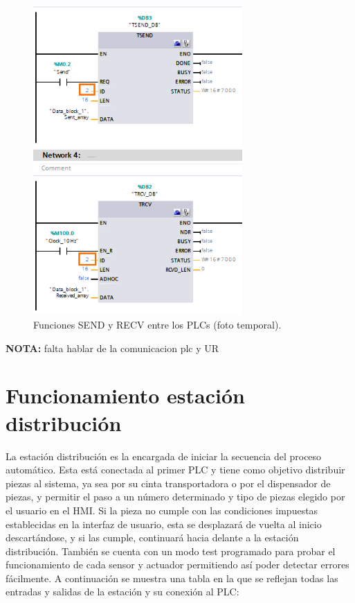\clearpage

\begin{figure} [h!]
  \begin{center}
    \includegraphics[width=8cm]{figs/comunicacion_plcs}
  \end{center}
  \caption{\centering Funciones SEND y RECV entre los PLCs (foto temporal).}
  \label{fig:comunicacion_plcs}
\end{figure} 

\textbf{NOTA:} falta hablar de la comunicacion plc y UR

\section{Funcionamiento estación distribución}
\label{sec:funcionamiento_distribucion}

La estación distribución es la encargada de iniciar la secuencia del proceso automático. Esta está conectada al primer PLC y tiene como objetivo distribuir piezas al sistema, ya sea por su cinta transportadora o por el dispensador de piezas, y permitir el paso a un número determinado y tipo de piezas elegido por el usuario en el HMI. Si la pieza no cumple con las condiciones impuestas establecidas en la interfaz de usuario, esta se desplazará de vuelta al inicio descartándose, y si las cumple, continuará hacia delante a la estación distribución. También se cuenta con un modo test programado para probar el funcionamiento de cada sensor y actuador permitiendo así poder detectar errores fácilmente. A continuación se muestra una tabla en la que se reflejan todas las entradas y salidas de la estación y su conexión al PLC:

